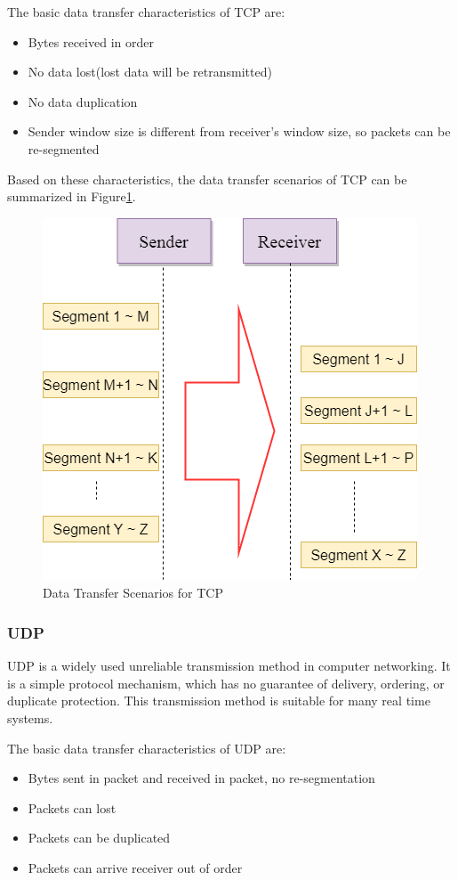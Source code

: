 The basic data transfer characteristics of TCP are:
\begin{itemize}
  \item Bytes received in order
  \item No data lost(lost data will be retransmitted)
  \item No data duplication
  \item Sender window size is different from receiver's window size, so packets can be re-segmented
\end{itemize}

Based on these characteristics,  the data transfer scenarios of TCP can be summarized in Figure\ref{tcp}.
\begin{figure}[H]
\centerline{\includegraphics[scale=0.48]{Figures/tcp}}
 \caption{Data Transfer Scenarios for TCP}
\label{tcp}
\end{figure}

\subsubsection{UDP}
UDP is a widely used unreliable transmission method in computer networking. It is a simple protocol mechanism, which has no guarantee of delivery, ordering, or duplicate protection. This transmission method is suitable for many real time systems. 

The basic data transfer characteristics of UDP are:
\begin{itemize}
  \item Bytes sent in packet and received in packet, no re-segmentation
  \item Packets can lost
  \item Packets can be duplicated
  \item Packets can arrive receiver out of order
\end{itemize}

